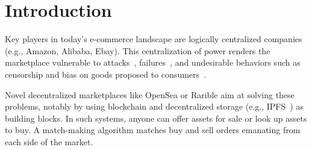 \section{Introduction}




Key players in today's e-commerce landscape are logically centralized companies (e.g., Amazon, Alibaba, Ebay).
This centralization of power renders the marketplace vulnerable to attacks~\cite{skim}, failures~\cite{cuthbertsonFacebookUsersReport2021,swearingenWhenAmazonWeb2018}, and undesirable behaviors such as censorship and bias on goods proposed to consumers~\cite{CensorshipGoogle2024,gargSteemitCensoringUsers2019,glaserHowAppleAmazon2017}.

Novel decentralized marketplaces like OpenSea %
 or Rarible %
 aim at solving these problems, notably by using blockchain and decentralized storage (e.g., IPFS~\cite{doan2022towards}) as building blocks. 
In such systems, anyone can offer assets for sale or look up assets to buy.
A match-making algorithm matches buy and sell orders emanating from each side of the market.

